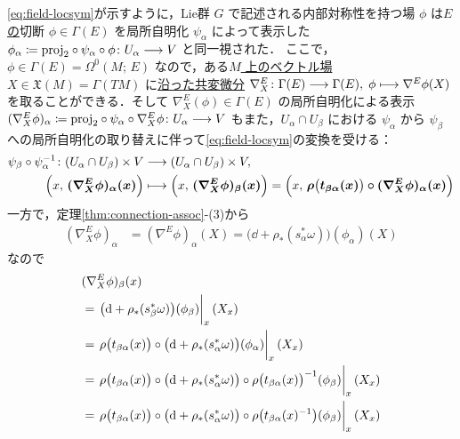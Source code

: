 \documentclass[TQFT_main]{subfiles}
\begin{document}
\eqref{eq:field-locsym}が示すように，Lie群 $G$ で記述される内部対称性を持つ場 $\phi$ は\underline{$E$ の}切断 $\phi \in \Gamma(E)$ を局所自明化 $\psi_\alpha$ によって表示した $\phi_\alpha \coloneqq \mathrm{proj}_2 \circ \psi_\alpha \circ \phi \colon U_\alpha \longrightarrow V$ と同一視された．
ここで，$\phi \in \Gamma(E) = \Omega^0 (M;\, E)$ なので，ある\underline{$M$ 上の}\hyperref[def:vecf]{ベクトル場} $X \in \mathfrak{X}(M) = \Gamma(TM)$ に\hyperref[def:connection-vect]{沿った共変微分} $\nabla_X^E \colon \Gamma(E) \longrightarrow \Gamma(E),\; \phi \longmapsto \nabla^E\phi(X)$ を取ることができる．そして $\nabla^E_X (\phi) \in \Gamma (E)$ の局所自明化による表示 $(\nabla^E_X \phi)_\alpha \coloneqq \mathrm{proj}_2 \circ \psi_\alpha \circ \nabla^E_X \phi \colon U_\alpha \longrightarrow V$ もまた，$U_\alpha \cap U_\beta$ における $\psi_\alpha$ から $\psi_\beta$ への局所自明化の取り替えに伴って\eqref{eq:field-locsym}の変換を受ける：
\begin{align}
    \psi_\beta \circ \psi_\alpha^{-1} \colon (U_\alpha \cap U_\beta) \times V &\longrightarrow (U_\alpha \cap U_\beta) \times V, \\
    \Bigl( x,\, \bm{(\nabla_X^E\phi)_\alpha (x)} \Bigr) &\longmapsto \Bigl( x,\, \bm{(\nabla_X^E\phi)_\beta (x)}  \Bigr) = \Bigl( x,\, \bm{\rho\bigl(t_{\beta\alpha}(x)\bigr) \circ (\nabla_X^E\phi)_\alpha (x)}  \Bigr) 
\end{align}
一方で，定理\ref{thm:connection-assoc}-(3)から
\begin{align}
    (\nabla_X^E\phi)_\alpha
    &= (\nabla^E\phi)_\alpha(X)
    = \bigl( \dd + \rho_* (s^*_\alpha \omega) \bigr)( \phi_\alpha ) (X)
\end{align}
なので
\begin{align}
    &(\nabla_X^E\phi)_\beta (x) \\
    &= \eval{\bigl( \dd + \rho_* (s^*_\beta \omega) \bigr) ( \phi_\beta )}_x (X_x) \\
    &= \eval{\rho \bigl( t_{\beta\alpha}(x) \bigr) \circ \bigl( \dd + \rho_* (s^*_\alpha \omega) \bigr) ( \phi_\alpha )}_x (X_x) \\
    &= \eval{\rho \bigl( t_{\beta\alpha}(x) \bigr) \circ \bigl( \dd + \rho_* (s^*_\alpha \omega) \bigr) \circ \rho\bigl(t_{\beta\alpha}(x)\bigr)^{-1} (\phi_\beta)}_x (X_x) \\
    &= \eval{\rho \bigl( t_{\beta\alpha}(x) \bigr) \circ \bigl( \dd + \rho_* (s^*_\alpha \omega) \bigr) \circ \rho\bigl(t_{\beta\alpha}(x)^{-1}\bigr) (\phi_\beta)}_x (X_x)
\end{align}
\end{document}
